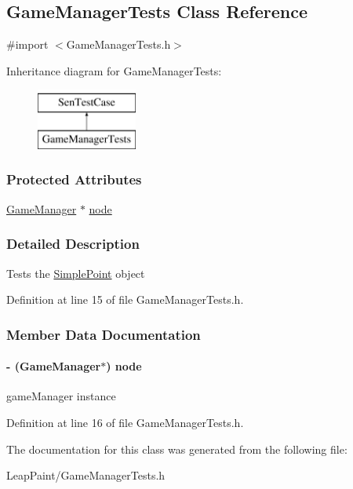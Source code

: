 \hypertarget{interface_game_manager_tests}{\subsection{Game\-Manager\-Tests Class Reference}
\label{d2/d7d/interface_game_manager_tests}
}


{\ttfamily \#import $<$Game\-Manager\-Tests.\-h$>$}

Inheritance diagram for Game\-Manager\-Tests\-:\begin{figure}[H]
\begin{center}
\leavevmode
\includegraphics[height=2.000000cm]{d2/d7d/interface_game_manager_tests}
\end{center}
\end{figure}
\subsubsection*{Protected Attributes}
\begin{DoxyCompactItemize}
\item 
\hyperlink{interface_game_manager}{Game\-Manager} $\ast$ \hyperlink{interface_game_manager_tests_af0831d60fcbb503cc3660bc53c5ebb32}{node}
\end{DoxyCompactItemize}


\subsubsection{Detailed Description}
Tests the \hyperlink{interface_simple_point}{Simple\-Point} object 

Definition at line 15 of file Game\-Manager\-Tests.\-h.



\subsubsection{Member Data Documentation}
\hypertarget{interface_game_manager_tests_af0831d60fcbb503cc3660bc53c5ebb32}{
\paragraph[{node}]{\setlength{\rightskip}{0pt plus 5cm}-\/ ({\bf Game\-Manager}$\ast$) node\hspace{0.3cm}{\ttfamily [protected]}}}\label{d2/d7d/interface_game_manager_tests_af0831d60fcbb503cc3660bc53c5ebb32}
game\-Manager instance 

Definition at line 16 of file Game\-Manager\-Tests.\-h.



The documentation for this class was generated from the following file\-:\begin{DoxyCompactItemize}
\item 
Leap\-Paint/Game\-Manager\-Tests.\-h\end{DoxyCompactItemize}
